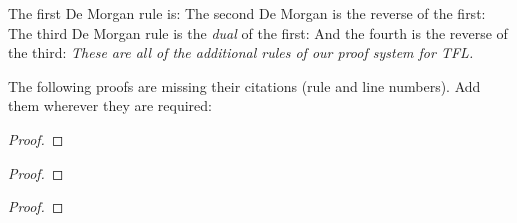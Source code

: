 The first De Morgan rule is:
The second De Morgan is the reverse of the first:
The third De Morgan rule is the \emph{dual} of the first:
And the fourth is the reverse of the third:
\emph{These are all of the additional rules of our proof system for TFL.}

\practiceproblems
\solutions
\problempart
\label{pr.justifyTFLproof}
The following proofs are missing their citations (rule and line numbers). Add them wherever they are required:
\begin{multicols}{2}
\begin{proof}
 {}
 {}
\end{proof}
\vfill
\begin{proof}
\open
\close
{}
\end{proof}
\columnbreak
\begin{proof}
\open
	 {}
		\open
	\close
\close
{}
\end{proof}
\end{multicols}

